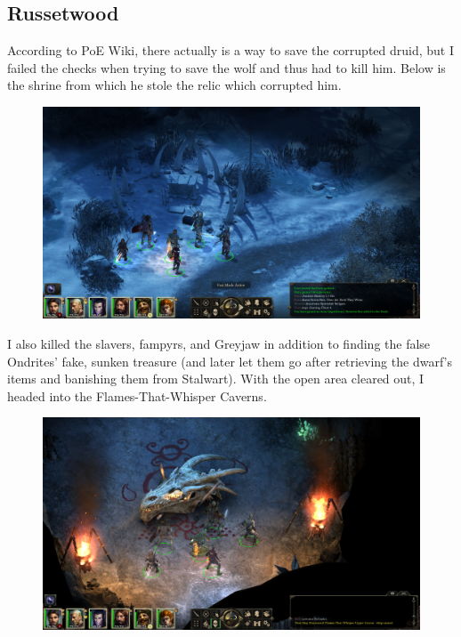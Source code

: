 \documentclass{article}
\begin{document}
\subsection{Russetwood}
According to PoE Wiki, there actually is a way to save the corrupted druid, but I failed the checks when trying to save the wolf and thus had to kill him.  Below is the shrine from which he stole the relic which corrupted him.

\begin{figure}
\includegraphics[scale=0.33]{files/blog/2019_08_17_poe_potd_wmpt1/2019_08_17_russetwood_1.jpg}
\end{figure}

I also killed the slavers, fampyrs, and Greyjaw in addition to finding the false Ondrites' fake, sunken treasure (and later let them go after retrieving the dwarf's items and banishing them from Stalwart).  With the open area cleared out, I headed into the Flames-That-Whisper Caverns.

\begin{figure}
\includegraphics[scale=0.33]{files/blog/2019_08_17_poe_potd_wmpt1/2019_08_17_russetwood_2.jpg}
\end{figure}
\end{document}
